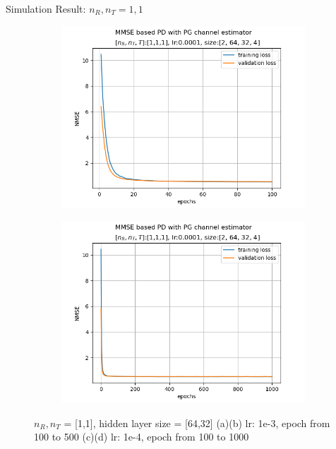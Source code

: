\documentclass[hyperref={bookmarks=false}]{beamer}
\numberwithin{figure}{section}
\begin{document}
\begin{frame}{Simulation Result: $n_R, n_T = 1, 1$}
\begin{figure}[h!]
\begin{subfigure}[b]{0.33\linewidth}
    \end{subfigure}
    \begin{subfigure}[b]{0.33\linewidth}
      \includegraphics[width=\linewidth]{figures/240502/figure_1_0.0001_[2, 64, 32, 4]_ep100.png}
    \end{subfigure}
    \begin{subfigure}[b]{0.33\linewidth}
      \includegraphics[width=\linewidth]{figures/240502/figure_1_0.0001_[2, 64, 32, 4]_ep1000.png}
    \end{subfigure}
    \caption{$n_R, n_T$ = [1,1], hidden layer size = [64,32]
        (a)(b) lr: 1e-3, epoch from 100 to 500
        (c)(d) lr: 1e-4, epoch from 100 to 1000}
  \end{figure}
\end{frame}
\end{document}
